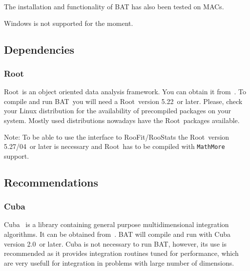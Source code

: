 \documentclass[11pt, a4paper]{article}
\newcommand{\bat}{{\sc BAT}}
\newcommand{\Root}{{\sc Root}}
\newcommand{\RootVersion}{5.22}
\newcommand{\RooStatsVersion}{5.27/04}
\newcommand{\CubaVersion}{2.0}
\begin{document}
The installation and functionality of BAT has also been tested on MACs.

Windows is not supported for the moment.


\subsection{Dependencies}
\subsubsection{\Root}
\Root\ is an object oriented data analysis framework. You can obtain it
from~\cite{ROOTweb}. To compile and run \bat\ you will need a \Root\
version \RootVersion\ or later. Please, check your Linux distribution for the
availability of precompiled packages on your system. Mostly used
distributions nowadays have the \Root\ packages available.

Note: To be able to use the interface to RooFit/RooStats the \Root\
version \RooStatsVersion\ or later is necessary and \Root\ has to be compiled
with \verb|MathMore| support.


\subsection{Recommendations}
\addtocontents{toc}{\protect\setcounter{tocdepth}{2}}
\subsubsection{Cuba}
\addtocontents{toc}{\protect\setcounter{tocdepth}{3}}
Cuba~\cite{CUBA} is a library containing general purpose
multidimensional integration algorithms. It can be obtained
from~\cite{CUBAweb}. BAT will compile and run with Cuba version
\CubaVersion\ or later. Cuba is not necessary to run BAT, however, its
use is recommended as it provides integration routines tuned for
performance, which are very usefull for integration in problems with
large number of dimensions.
\end{document}
